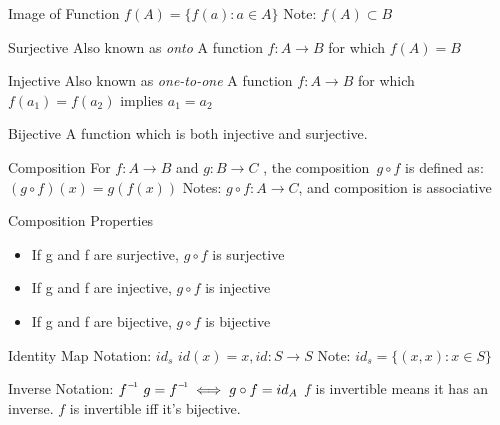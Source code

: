 \begin{flashcard}[Definition]{Image of Function}
  $f(A) = \{f(a): a \in A\}$
  \vfill
  Note: $f(A) \subset B$
\end{flashcard}

\begin{flashcard}[Definition]{Surjective}
  Also known as \emph{onto}
  \vfill
  A function $f: A \to B$ for which $f(A) = B$
\end{flashcard}

\begin{flashcard}[Definition]{Injective}
  Also known as \emph{one-to-one}
  \vfill
  A function $f: A \to B$ for which $f(a_1) = f(a_2)$ implies $a_1 = a_2$
\end{flashcard}

\begin{flashcard}[Definition]{Bijective}
  A function which is both injective and surjective.
\end{flashcard}

\begin{flashcard}[Definition]{Composition}
  For $f: A \to B$ and $g: B \to C$ , the composition~$g \circ f$ is defined as:
  \vfill
  $(g \circ f)(x) = g(f(x))$
  \vfill
  Notes: $g \circ f: A \to C$, and composition is associative
\end{flashcard}

\begin{flashcard}[Definition]{Composition Properties}
  \begin{itemize}
    \item If g and f are surjective, $g \circ f$ is surjective
    \item If g and f are injective, $g \circ f$ is injective
    \item If g and f are bijective, $g \circ f$ is bijective
  \end{itemize}
\end{flashcard}

\begin{flashcard}[Definition]{Identity Map}
  Notation: $id_s$
  \vfill
  $id(x) = x, id: S \to S$
  \vfill
  Note: $id_s = \{ (x,x): x \in S \}$
\end{flashcard}

\begin{flashcard}[Definition]{Inverse}
  Notation: $\inv{f}$
  \vfill
  $g = \inv{f} \iff g \circ f = id_A$
  \vfill
  $f$ is invertible means it has an inverse.
  \vfill
  $f$ is invertible iff it's bijective.
\end{flashcard}

